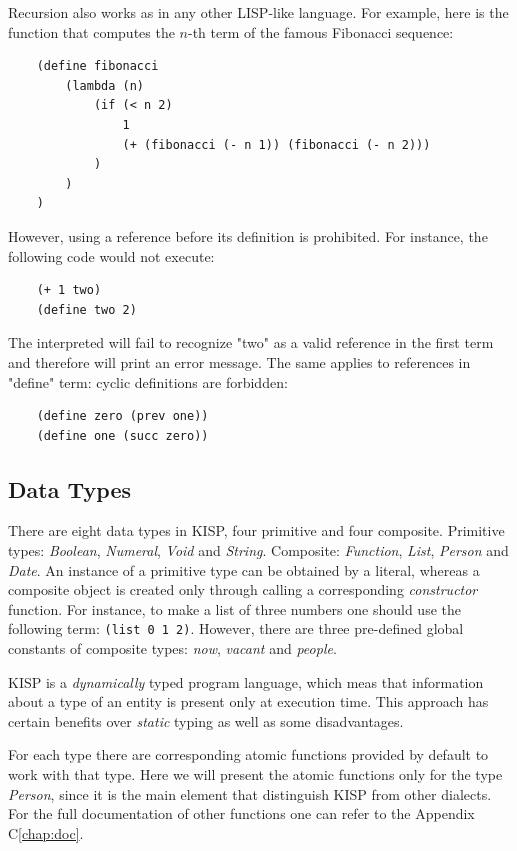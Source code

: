     Recursion also works as in any other LISP-like language. For example, here is the function that computes the $n$-th term of
    the famous Fibonacci sequence:
    \begin{verbatim}
    (define fibonacci
        (lambda (n)
            (if (< n 2)
                1
                (+ (fibonacci (- n 1)) (fibonacci (- n 2)))
            )
        )
    )
    \end{verbatim}
    However, using a reference before its definition is prohibited. For instance, the following code would not execute:
    \begin{verbatim}
    (+ 1 two)
    (define two 2)
    \end{verbatim}
    The interpreted will fail to recognize "two" as a valid reference in the first term and therefore will print an error message.
    The same applies to references in "define" term: cyclic definitions are forbidden:
    \begin{verbatim}
    (define zero (prev one))
    (define one (succ zero))
    \end{verbatim}

\subsection{Data Types}
    There are eight data types in KISP, four primitive and four composite. Primitive types: \textit{Boolean}, \textit{Numeral},
    \textit{Void} and \textit{String}. Composite: \textit{Function}, \textit{List}, \textit{Person} and \textit{Date}. An instance of
    a primitive type can be obtained by a literal, whereas a composite object is created only through calling a corresponding
    \textit{constructor} function. For instance, to make a list of three numbers one should use the following term: \texttt{(list 0 1
    2)}. However, there are three pre-defined global constants of composite types: \textit{now}, \textit{vacant} and \textit{people}.

    KISP is a \textit{dynamically} typed program language, which meas that information about a type of an entity is present only at
    execution time. This approach has certain benefits over \textit{static} typing as well as some disadvantages.

    For each type there are corresponding atomic functions provided by default to work with that type. Here we will present the atomic
    functions only for the type \textit{Person}, since it is the main element that distinguish KISP from other dialects. For the full
    documentation of other functions one can refer to the Appendix C\ref{chap:doc}.

